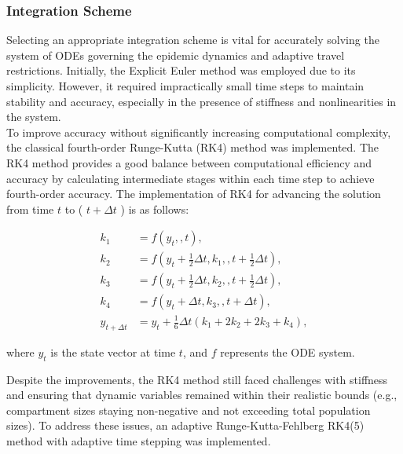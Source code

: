 \subsubsection{Integration Scheme}

Selecting an appropriate integration scheme is vital for accurately solving the system of ODEs governing the epidemic dynamics and adaptive travel restrictions. Initially, the Explicit Euler method was employed due to its simplicity. However, it required impractically small time steps to maintain stability and accuracy, especially in the presence of stiffness and nonlinearities in the system.\\

To improve accuracy without significantly increasing computational complexity, the classical fourth-order Runge-Kutta (RK4) method was implemented. The RK4 method provides a good balance between computational efficiency and accuracy by calculating intermediate stages within each time step to achieve fourth-order accuracy. The implementation of RK4 for advancing the solution from time $t$ to ( $t + \Delta t$ ) is as follows:

\begin{align*} 
	k_1 &= f\left(y_t,, t\right), \\ k_2 &= f\left(y_t + \tfrac{1}{2}\Delta t, k_1,, t + \tfrac{1}{2}\Delta t\right), \\ k_3 &= f\left(y_t + \tfrac{1}{2}\Delta t, k_2,, t + \tfrac{1}{2}\Delta t\right), \\ k_4 &= f\left(y_t + \Delta t, k_3,, t + \Delta t\right), \\ y_{t + \Delta t} &= y_t + \tfrac{1}{6}\Delta t\left(k_1 + 2k_2 + 2k_3 + k_4\right), \end{align*}

where $y_t$ is the state vector at time $t$, and $f$ represents the ODE system.

Despite the improvements, the RK4 method still faced challenges with stiffness and ensuring that dynamic variables remained within their realistic bounds (e.g., compartment sizes staying non-negative and not exceeding total population sizes). To address these issues, an adaptive Runge-Kutta-Fehlberg RK4(5) method with adaptive time stepping was implemented.

